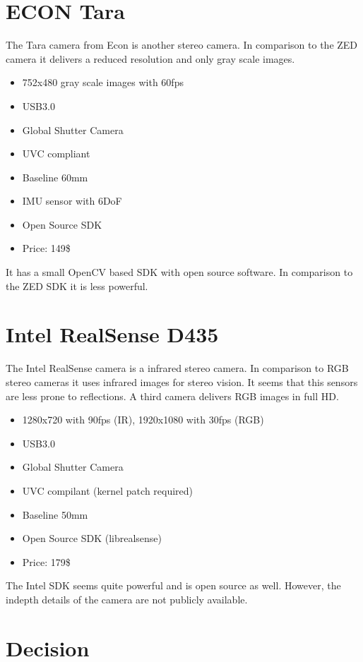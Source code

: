 \documentclass[11pt,a4paper,titlepage,oneside]{report}
\begin{document}
\section{ECON Tara}
The Tara camera \cite{tara} from Econ is another stereo camera. In comparison to the ZED camera it delivers a reduced resolution and only gray scale images.
\begin{itemize}
	\item 752x480 gray scale images with 60fps
	\item USB3.0
	\item Global Shutter Camera
	\item UVC compliant
	\item Baseline 60mm
	\item IMU sensor with 6DoF
	\item Open Source SDK
	\item Price: 149\$
\end{itemize}

It has a small OpenCV based SDK with open source software. In comparison to the ZED SDK it is less powerful.

\section{Intel RealSense D435}
The Intel RealSense camera \cite{realsense} is a infrared stereo camera. In comparison to RGB stereo cameras it uses infrared images for stereo vision. It seems that this sensors are less prone to reflections. A third camera delivers RGB images in full HD.
\begin{itemize}
	\item 1280x720 with 90fps (IR), 1920x1080 with 30fps (RGB)
	\item USB3.0
	\item Global Shutter Camera
	\item UVC compilant (kernel patch required)
	\item Baseline 50mm
	\item Open Source SDK (librealsense)
	\item Price: 179\$
\end{itemize}

The Intel SDK seems quite powerful and is open source as well. However, the indepth details of the camera are not publicly available.

\section{Decision}
\end{document}
